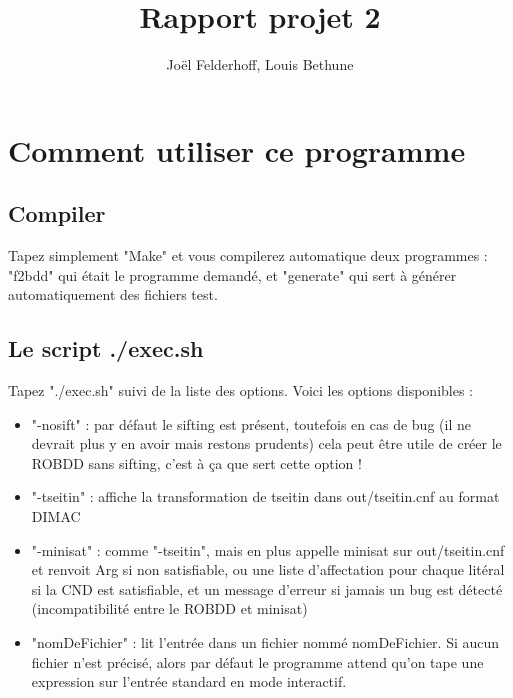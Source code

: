 \documentclass[a4paper,10pt]{article}
\title{Rapport projet 2}
\author{Joël Felderhoff, Louis Bethune}
\begin{document}

\posttitle{\end{center}}
\maketitle

\section{Comment utiliser ce programme}

\subsection{Compiler}

Tapez simplement "Make" et vous compilerez automatique deux programmes : "f2bdd" qui était le programme demandé, et "generate" qui sert à générer automatiquement des fichiers test.  

\subsection{Le script ./exec.sh}

Tapez "./exec.sh" suivi de la liste des options.
Voici les options disponibles :

\begin{itemize}
\item "-nosift" : par défaut le sifting est présent, toutefois en cas de bug (il ne devrait plus y en avoir mais restons prudents) cela peut être utile de créer le ROBDD sans sifting, c'est à ça que sert cette option !
\item "-tseitin" : affiche la transformation de tseitin dans out/tseitin.cnf au format DIMAC
\item "-minisat" : comme "-tseitin", mais en plus appelle minisat sur out/tseitin.cnf et renvoit Arg si non satisfiable, ou une liste d'affectation pour chaque litéral si la CND est satisfiable, et un message d'erreur si jamais un bug est détecté (incompatibilité entre le ROBDD et minisat)
\item "nomDeFichier" : lit l'entrée dans un fichier nommé nomDeFichier. Si aucun fichier n'est précisé, alors par défaut le programme attend qu'on tape une expression sur l'entrée standard en mode interactif.
\end{itemize}
\end{document}
